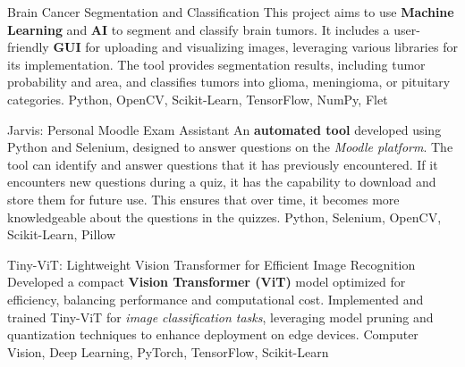 
\begin{projects}
  \project
  {Brain Cancer Segmentation and Classification}{}
  { }
  {This project aims to use \textbf{Machine Learning} and \textbf{AI} to segment and classify brain tumors.
    It includes a user-friendly \textbf{GUI} for uploading and visualizing images, leveraging various libraries for its
    implementation. The tool provides segmentation results, including tumor probability and area, and classifies
  tumors into glioma, meningioma, or pituitary categories.}
  {Python, OpenCV, Scikit-Learn, TensorFlow, NumPy, Flet}

  \project
  {Jarvis: Personal Moodle Exam Assistant}{}
  {}
  {An \textbf{automated tool} developed using Python and Selenium, designed to answer questions on the \textit{Moodle platform}. The tool can identify and answer questions that it has previously encountered. If it encounters new questions during a quiz, it has the capability to download and store them for future use. This ensures that over time, it becomes more knowledgeable about the questions in the quizzes.}
  {Python, Selenium, OpenCV, Scikit-Learn, Pillow}

  \project
  {Tiny-ViT: Lightweight Vision Transformer for Efficient Image Recognition}{}
  {}
  {Developed a compact \textbf{Vision Transformer (ViT)} model optimized for efficiency, balancing performance and computational cost. Implemented and trained Tiny-ViT for \textit{image classification tasks}, leveraging model pruning and quantization techniques to enhance deployment on edge devices.}
  {Computer Vision, Deep Learning, PyTorch, TensorFlow, Scikit-Learn}
\end{projects}
